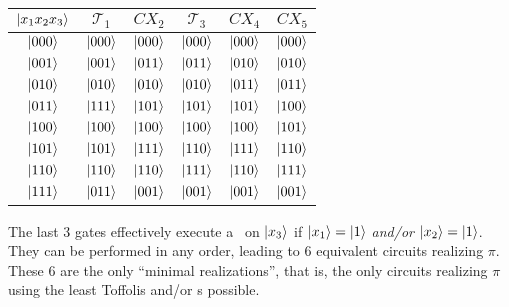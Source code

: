 \begin{center}
\begin{tabular}{c|c|c|c|c|c|} 
$\ket{x_1x_2x_3}$ & $\mathcal{T}_1$ & $CX_2$ & $\mathcal{T}_3$ & $CX_4$ & $CX_5$\\
\hline
$\ket{000}$ & $\ket{000}$ & $\ket{000}$ & $\ket{000}$ & $\ket{000}$ & $\ket{000}$ \\
\hline
$\ket{001}$  & $\ket{001}$ & $\ket{011}$ & $\ket{011}$ & $\ket{010}$ & $\ket{010}$  \\
\hline
$\ket{010}$ & $\ket{010}$ & $\ket{010}$ & $\ket{010}$ & $\ket{011}$ & $\ket{011}$ \\
\hline
$\ket{011}$ & $\ket{111}$ & $\ket{101}$ & $\ket{101}$ & $\ket{101}$ & $\ket{100}$ \\
\hline
$\ket{100}$ & $\ket{100}$ & $\ket{100}$ & $\ket{100}$ & $\ket{100}$ & $\ket{101}$ \\
\hline
$\ket{101}$ & $\ket{101}$ & $\ket{111}$ & $\ket{110}$ & $\ket{111}$ & $\ket{110}$ \\
\hline
$\ket{110}$ & $\ket{110}$ & $\ket{110}$ & $\ket{111}$ & $\ket{110}$ & $\ket{111}$ \\
\hline
$\ket{111}$ & $\ket{011}$ & $\ket{001}$ & $\ket{001}$ & $\ket{001}$ & $\ket{001}$ 
\end{tabular}
\end{center}
\vspace{-10pt}
The last 3 gates effectively execute a \NOT\ on $\ket{x_3}$ if $\ket{x_1}=\ket{1}$ \textit{and/or} $\ket{x_2}=\ket{1}$.  They can be performed in any order, leading to 6 equivalent circuits realizing $\pi$.  These 6 are the only ``minimal realizations'', that is, the only circuits realizing $\pi$ using the least Toffolis and/or \CNOT s possible.  

